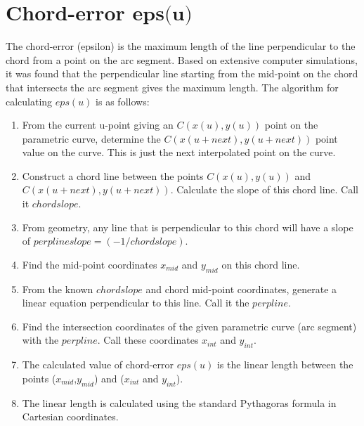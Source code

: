 
\section{Chord-error $\textbf{eps(u)}$}
\label{chap3-Chord-error eps}

The chord-error (epsilon) is the maximum length of the line perpendicular to the chord from a point on the arc segment. Based on extensive computer simulations, it was found that the perpendicular line starting from the mid-point on the chord that intersects the arc segment gives the maximum length. The algorithm for calculating $eps(u)$ is as follows:

\begin{enumerate}
	\item From the current u-point giving an $C(x(u), y(u))$ point on the parametric curve, determine the $C(x(u+next), y(u+next))$ point value on the curve. This is just the next interpolated point on the curve. 
	
	\item Construct a chord line between the points $C(x(u), y(u))$ and $C(x(u+next), y(u+next))$. Calculate the slope of this chord line. Call it $chordslope$.
	
	\item From geometry, any line that is perpendicular to this chord will have a slope of $perplineslope = (-1/chordslope)$.
	
	\item Find the mid-point coordinates $x_{mid}$ and $y_{mid}$ on this chord line.
	
	\item From the known $chordslope$ and chord mid-point coordinates, generate a linear equation perpendicular to this line. Call it the $perpline$.
	
	\item Find the intersection coordinates of the given parametric curve (arc segment) with the $perpline$. Call these coordinates $x_{int}$ and $y_{int}$. 
	
	\item The calculated value of chord-error $eps(u)$ is the linear length between the points ($x_{mid}$,$y_{mid}$) and ($x_{int}$ and $y_{int}$).
	
	\item The linear length is calculated using the standard Pythagoras formula in Cartesian coordinates.
	
\end{enumerate}

